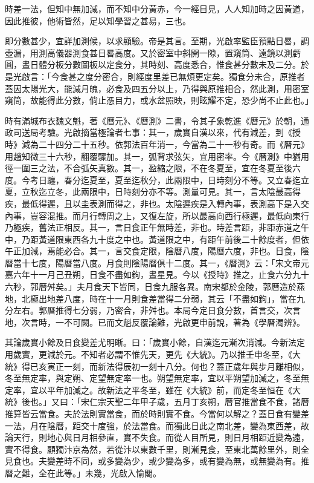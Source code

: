 時差一法，但知中無加減，而不知中分黃赤，今一經目見，人人知加時之因黃道，因此推彼，他術皆然，足以知學習之甚易，三也。

即分數甚少，宜詳加測候，以求顯驗。帝是其言。至期，光啟率監臣預點日晷，調壺漏，用測高儀器測食甚日晷高度。又於密室中斜開一隙，置窺筒、遠鏡以測虧圓，晝日體分板分數圖板以定食分，其時刻、高度悉合，惟食甚分數未及二分。於是光啟言：「今食甚之度分密合，則經度里差已無煩更定矣。獨食分未合，原推者蓋因太陽光大，能減月魄，必食及四五分以上，乃得與原推相合，然此測，用密室窺筒，故能得此分數，倘止憑目力，或水盆照映，則眩耀不定，恐少尚不止此也。」

時有滿城布衣魏文魁，著《曆元》、《曆測》二書，令其子象乾進《曆元》於朝，通政司送局考驗。光啟摘當極論者七事：其一，歲實自漢以來，代有減差，到《授時》減為二十四分二十五秒。依郭法百年消一，今當為二十一秒有奇。而《曆元》用趙知微三十六秒，翻覆驟加。其一，弧背求弦矢，宜用密率。今《曆測》中猶用徑一圍三之法，不合弧矢真數。其一，盈縮之限，不在冬夏至，宜在冬夏至後六度。今考日躔，春分迄夏至，夏至迄秋分，此兩限中，日時刻分不等。又立春迄立夏，立秋迄立冬，此兩限中，日時刻分亦不等。測量可見。其一，言太陰最高得疾，最低得遲，且以圭表測而得之，非也。太陰遲疾是入轉內事，表測高下是入交內事，豈容混推。而月行轉周之上，又復左旋，所以最高向西行極遲，最低向東行乃極疾，舊法正相反。其一，言日食正午無時差，非也。時差言距，非距赤道之午中，乃距黃道限東西各九十度之中也。黃道限之中，有距午前後二十餘度者，但依午正加減，焉能必合。其一，言交食定限，陰曆八度，陽曆六度，非也。日食，陰曆當十七度，陽曆當八度。月食則陰陽曆俱十二度。其一，《曆測》云：「宋文帝元嘉六年十一月己丑朔，日食不盡如鉤，晝星見。今以《授時》推之，止食六分九十六秒，郭曆舛矣。」夫月食天下皆同，日食九服各異。南宋都於金陵，郭曆造於燕地，北極出地差八度，時在十一月則食差當得二分弱，其云「不盡如鉤」，當在九分左右。郭曆推得七分弱，乃密合，非舛也。本局今定日食分數，首言交，次言地，次言時，一不可闕。已而文魁反覆論難，光啟更申前說，著為《學曆濁辨》。

其論歲實小餘及日食變差尤明晰。曰：「歲實小餘，自漢迄元漸次消減。今新法定用歲實，更減於元。不知者必謂不惟先天，更先《大統》。乃以推壬申冬至，《大統》得已亥寅正一刻，而新法得辰初一刻十八分。何也？蓋正歲年與步月離相似，冬至無定率，與定朔、定望無定率一也。朔望無定率，宜以平朔望加減之，冬至無定率，宜以平年加減之。故新法之平冬至，雖在《大統》前，而定冬至恒在《大統》後也。」又曰：「宋仁宗天聖二年甲子歲，五月丁亥朔，曆官推當食不食，諸曆推算皆云當食。夫於法則實當食，而於時則實不食。今當何以解之？蓋日食有變差一法，月在陰曆，距交十度強，於法當食。而獨此日此之南北差，變為東西差，故論天行，則地心與日月相參直，實不失食。而從人目所見，則日月相距近變為遠，實不得食。顧獨汴京為然，若從汴以東數千里，則漸見食，至東北萬餘里外，則全見食也。夫變差時不同，或多變為少，或少變為多，或有變為無，或無變為有。推曆之難，全在此等。」未幾，光啟入愉閣。

